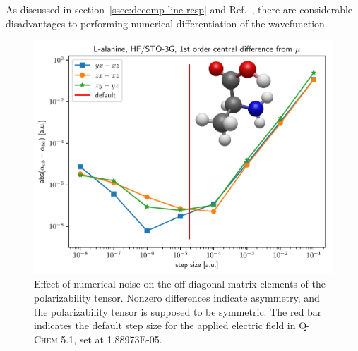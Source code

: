 \documentclass[%
class = book,%
crop = false,%
float = true,%
multi = true,%
preview = false,%
]{standalone}
\newcommand\qchem{\textsc{Q-Chem}}
\begin{document}
As discussed in section~\ref{ssec:decomp-line-resp} and Ref.~\parencite{gauss2000}, there are considerable disadvantages to performing numerical differentiation of the wavefunction.


\begin{figure}
  \centering
  \includegraphics[width=\textwidth]{./diff_overlay.pdf}
  \caption[Asymmetry in the 1st-order finite-difference polarizability]{Effect of numerical noise on the off-diagonal matrix elements of the polarizability tensor. Nonzero differences indicate asymmetry, and the polarizability tensor is supposed to be symmetric. The red bar indicates the default step size for the applied electric field in \qchem{} 5.1, set at \SI{1.88973E-05}{\au}.\label{fig:finite-difference-numerical-noise}}
\end{figure}

\subsection{\texorpdfstring{\href{https://chemistry.stackexchange.com/q/89831/194}{\color{black}{Analytic derivative theory}}}{Analytic derivative theory}}
\label{ssec:analytic-derivative-theory}
\end{document}
